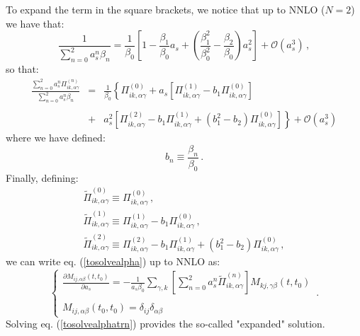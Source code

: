 \documentclass[10pt,a4paper]{article}
\begin{document}
To expand the term in the square brackets, we notice that up to NNLO ($N=2$)
we have that:
\begin{equation}
\frac{1}{\displaystyle \sum_{n=0}^{2} a_s^n \beta_n} =
\frac1{\beta_0}\left[ 1 - \frac{\beta_1}{\beta_0} a_s + \left(\frac{\beta_1^2}{\beta_0^2}- \frac{\beta_2}{\beta_0}\right)a_s^2\right] + \mathcal{O}(a_s^{3})\,,
\end{equation}
so that:
\begin{equation}
\begin{array}{rcl}
\displaystyle\frac{\displaystyle \sum_{n=0}^2 a_s^n
    \Pi_{ik,\alpha\gamma}^{(n)}}{ \displaystyle \sum_{n=0}^{2} a_s^n
    \beta_n} &=&\displaystyle \frac{1}{\beta_0}\left\{\Pi_{ik,\alpha\gamma}^{(0)} +
a_s\left[\Pi_{ik,\alpha\gamma}^{(1)} - b_1 \Pi_{ik,\alpha\gamma}^{(0)}\right]\right.\\
\\
&+& \displaystyle
\left. a_s^2\left[\Pi_{ik,\alpha\gamma}^{(2)} - b_1
\Pi_{ik,\alpha\gamma}^{(1)} +\left(b_1^2-b_2\right)
\Pi_{ik,\alpha\gamma}^{(0)} \right]\right\}  + \mathcal{O}(a_s^{3})
\end{array}
\end{equation}
where we have defined:
\begin{equation}
b_n \equiv \frac{\beta_n}{\beta_0}\,.
\end{equation}
Finally, defining:
\begin{equation}
\begin{array}{l}
\displaystyle\widetilde{\Pi}_{ik,\alpha\gamma}^{(0)} \equiv
\Pi_{ik,\alpha\gamma}^{(0)} \,,\\
\displaystyle\widetilde{\Pi}_{ik,\alpha\gamma}^{(1)} \equiv
\Pi_{ik,\alpha\gamma}^{(1)} - b_1 \Pi_{ik,\alpha\gamma}^{(0)} \,,\\
\displaystyle\widetilde{\Pi}_{ik,\alpha\gamma}^{(2)} \equiv \Pi_{ik,\alpha\gamma}^{(2)} - b_1
\Pi_{ik,\alpha\gamma}^{(1)} +\left(b_1^2-b_2\right)
\Pi_{ik,\alpha\gamma}^{(0)}\,,
\end{array}
\end{equation}
we can write eq. (\ref{tosolvealpha}) up to NNLO as:
\begin{equation}\label{tosolvealphatrn}
\left\{\begin{array}{l}
\displaystyle \frac{\partial  M_{ij,\alpha\beta}(t,t_0)}{\partial
  a_s}= -\frac{1}{a_s\beta_0}\sum_{\gamma,k} \left[\displaystyle \sum_{n=0}^2 a_s^n
    \widetilde{\Pi}_{ik,\alpha\gamma}^{(n)}\right]M_{kj,\gamma\beta}(t,t_0)\\
\\
\displaystyle M_{ij,\alpha\beta}(t_0,t_0)=\delta_{ij}\delta_{\alpha\beta}
\end{array}\right.\,.
\end{equation}
Solving eq. (\ref{tosolvealphatrn}) provides the so-called "expanded" solution.
\end{document}
